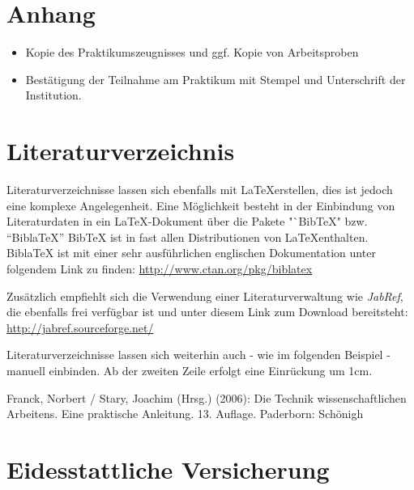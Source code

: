 ﻿\documentclass{Vorlage}
\begin{document}
\newpage

\section{Anhang}

\begin{itemize}

\item Kopie des Praktikumszeugnisses und ggf. Kopie von Arbeitsproben

\item Bestätigung der Teilnahme am Praktikum mit Stempel und Unterschrift der Institution.

\end{itemize}

\newpage

\section{Literaturverzeichnis}

Literaturverzeichnisse lassen sich ebenfalls mit \LaTeX erstellen, dies ist jedoch eine komplexe Angelegenheit. Eine Möglichkeit besteht in der Einbindung von Literaturdaten in ein \LaTeX-Dokument über die Pakete "`BibTeX" bzw. "`BiblaTeX"' BibTeX ist in fast allen Distributionen von \LaTeX enthalten. BiblaTeX ist mit einer sehr ausführlichen englischen Dokumentation unter folgendem Link zu finden: \url{http://www.ctan.org/pkg/biblatex}

Zusätzlich empfiehlt sich die Verwendung einer Literaturverwaltung wie \textit{JabRef}, die ebenfalls frei verfügbar ist und unter diesem Link zum Download bereitsteht: \url{http://jabref.sourceforge.net/}

Literaturverzeichnisse lassen sich weiterhin auch - wie im folgenden Beispiel - manuell einbinden. Ab der zweiten Zeile erfolgt eine Einrückung um 1cm.

\begin{description} %

\item Franck, Norbert / Stary, Joachim (Hrsg.) (2006): Die Technik wissenschaftlichen Arbeitens. Eine praktische Anleitung. 13. Auflage. Paderborn: Schönigh

\end{description}

\newpage

\section{Eidesstattliche Versicherung}
\end{document}
